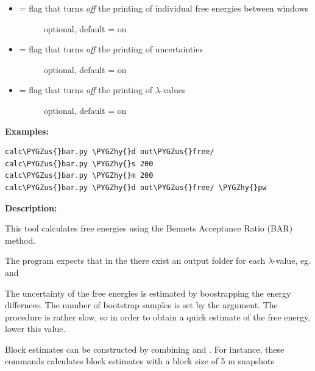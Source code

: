 \documentclass[letterpaper,10pt,english]{sphinxmanual}
\def\PYGZus{\char`\_}
\def\PYGZhy{\char`\-}
\begin{document}
\begin{itemize}
\begin{description}
\end{description}

\item {} \begin{description}
\item[{  = flag that turns \emph{off} the printing of individual free energies between windows}] \leavevmode
optional, default = on

\end{description}

\item {} \begin{description}
\item[{  = flag that turns \emph{off} the printing of uncertainties}] \leavevmode
optional, default = on

\end{description}

\item {} \begin{description}
\item[{  = flag that turns \emph{off} the printing of \(\lambda\)-values}] \leavevmode
optional, default = on

\end{description}

\end{itemize}

\textbf{Examples:}

\begin{Verbatim}[frame=single,commandchars=\\\{\}]
calc\PYGZus{}bar.py \PYGZhy{}d out\PYGZus{}free/
calc\PYGZus{}bar.py \PYGZhy{}s 200
calc\PYGZus{}bar.py \PYGZhy{}m 200
calc\PYGZus{}bar.py \PYGZhy{}d out\PYGZus{}free/ \PYGZhy{}pw
\end{Verbatim}

\textbf{Description:}

This tool calculates free energies using the Bennets Acceptance Ratio (BAR) method.

The program expects that in the  there exist an output folder for each \(\lambda\)-value, eg.  and 

The uncertainty of the free energies is estimated by boostrapping the energy differnces. The number of bootstrap samples is set by the  argument. The procedure is rather slow, so in order to obtain a quick estimate of the free energy, lower this value.

Block estimates can be constructed by combining  and . For instance, these commands calculates block estimates with a block size of 5 m snapshots
\end{document}
